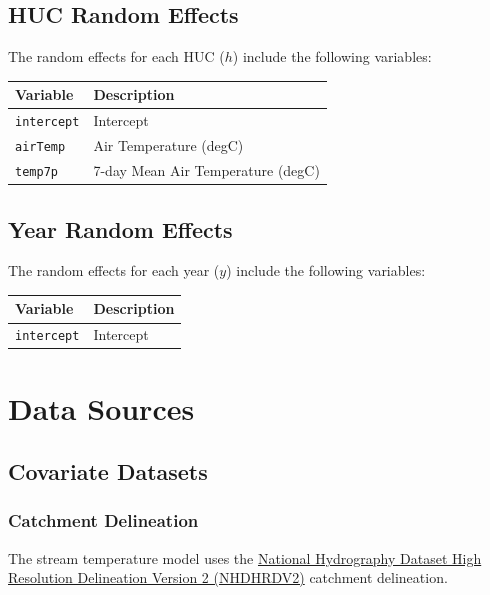 \documentclass[
]{book}
\begin{document}
\section{HUC Random Effects}\label{huc-random-effects}

The random effects for each HUC (\(h\)) include the following variables:

\begin{longtable}[]{@{}ll@{}}
\toprule\noalign{}
Variable & Description \\
\midrule\noalign{}
\endhead
\bottomrule\noalign{}
\endlastfoot
\texttt{intercept} & Intercept \\
\texttt{airTemp} & Air Temperature (degC) \\
\texttt{temp7p} & 7-day Mean Air Temperature (degC) \\
\end{longtable}

\section{Year Random Effects}\label{year-random-effects}

The random effects for each year (\(y\)) include the following variables:

\begin{longtable}[]{@{}ll@{}}
\toprule\noalign{}
Variable & Description \\
\midrule\noalign{}
\endhead
\bottomrule\noalign{}
\endlastfoot
\texttt{intercept} & Intercept \\
\end{longtable}

\chapter{Data Sources}\label{data-sources}

\section{Covariate Datasets}\label{covariate-datasets}

\subsection{Catchment Delineation}\label{catchment-delineation}

The stream temperature model uses the \href{https://ecosheds.github.io/necd/}{National Hydrography Dataset High Resolution Delineation Version 2 (NHDHRDV2)} catchment delineation.
\end{document}

